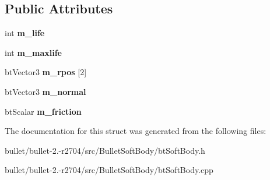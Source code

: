 \subsection*{Public Attributes}
\begin{DoxyCompactItemize}
\item 
\hypertarget{structbt_soft_body_1_1_c_joint_a49591228100e08973a61835c290b707b}{int {\bfseries m\+\_\+life}}\label{structbt_soft_body_1_1_c_joint_a49591228100e08973a61835c290b707b}

\item 
\hypertarget{structbt_soft_body_1_1_c_joint_ab796ab500e1b67afc274a65bbeed100e}{int {\bfseries m\+\_\+maxlife}}\label{structbt_soft_body_1_1_c_joint_ab796ab500e1b67afc274a65bbeed100e}

\item 
\hypertarget{structbt_soft_body_1_1_c_joint_a5ef822996ef5db8f8cf768b1ade8c1aa}{bt\+Vector3 {\bfseries m\+\_\+rpos} \mbox{[}2\mbox{]}}\label{structbt_soft_body_1_1_c_joint_a5ef822996ef5db8f8cf768b1ade8c1aa}

\item 
\hypertarget{structbt_soft_body_1_1_c_joint_a862813f43cdb37c9200bfb213d78d626}{bt\+Vector3 {\bfseries m\+\_\+normal}}\label{structbt_soft_body_1_1_c_joint_a862813f43cdb37c9200bfb213d78d626}

\item 
\hypertarget{structbt_soft_body_1_1_c_joint_ac27120e3c608f2f478a9ea3cffc03656}{bt\+Scalar {\bfseries m\+\_\+friction}}\label{structbt_soft_body_1_1_c_joint_ac27120e3c608f2f478a9ea3cffc03656}

\end{DoxyCompactItemize}


The documentation for this struct was generated from the following files\+:\begin{DoxyCompactItemize}
\item 
bullet/bullet-\/2.-\/r2704/src/\+Bullet\+Soft\+Body/bt\+Soft\+Body.\+h\item 
bullet/bullet-\/2.-\/r2704/src/\+Bullet\+Soft\+Body/bt\+Soft\+Body.\+cpp\end{DoxyCompactItemize}
